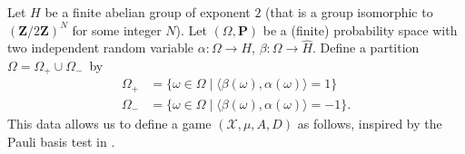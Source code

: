 \documentclass[JEP,XML,SOM,Unicode,published]{cedram}
\theoremstyle{plain}
\theoremstyle{definition}
\newcommand{\Z}{\mathbf{Z}}
\newcommand{\cX}{\mathcal{X}}
\newcommand{\prob}{\mathbf{P}}
\begin{document}
Let $H$ be a finite abelian group of exponent $2$ (that is a group isomorphic to $(\Z/2\Z)^N$ for some integer $N$). Let $(\Omega,\prob)$ be a (finite) probability space with two independent random variable $\alpha:\Omega \to H$, $\beta:\Omega \to \hat H$. Define a partition \hbox{$\Omega= \Omega_+ \cup \Omega_-$}~by\vspace*{-3pt}
\begin{align*}
\Omega_+ &= \{\omega \in \Omega \mid \langle \beta(\omega),\alpha(\omega)\rangle = 1\}
\\
\tag*{and}
\Omega_- &= \{\omega \in \Omega \mid \langle \beta(\omega),\alpha(\omega)\rangle = -1\}.
\end{align*}
This data allows us to define a game $(\cX,\mu,A,D)$ as follows, inspired by the Pauli basis test in \cite{MIPRE}.\vspace*{-3pt}
\end{document}
